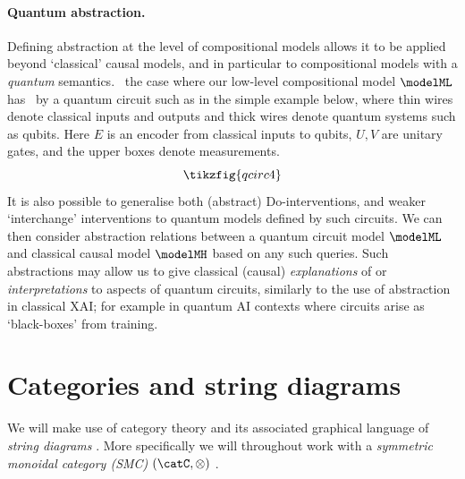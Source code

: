 \documentclass{article}
\begin{document}
\paragraph{Quantum abstraction.}
Defining abstraction at the level of compositional models allows it to be applied beyond `classical' causal models, and in particular to compositional models with a \emph{quantum} semantics. 
\
the case where our low-level compositional model $\modelML$ has \ by a quantum circuit such as in the simple example below, where thin wires denote classical inputs and outputs and thick wires denote quantum systems such as qubits. Here $E$ is an encoder from classical inputs to qubits, $U, V$ are unitary gates, and the upper boxes denote measurements.
\[
\tikzfig{qcirc4}
\]
It is also possible to generalise both (abstract) Do-interventions, and weaker `interchange' interventions to quantum models defined by such circuits. We can then consider abstraction relations between a quantum circuit model $\modelML$ and classical causal model $\modelMH$ based on any such queries. Such abstractions may allow us to give classical (causal) \emph{explanations} of or \emph{interpretations} to aspects of quantum circuits, similarly to the use of abstraction in classical XAI; for example in quantum AI contexts where circuits arise as `black-boxes' from training. 




\section{Categories and string diagrams} \label{sec:setup}

We will make use of category theory and its associated graphical language of \emph{string diagrams} \cite{coecke2006introducing,piedeleu2023introduction,selinger2011survey}. More specifically we will throughout work with a \emph{symmetric monoidal category (SMC)} $(\catC, \otimes)$ . 
\end{document}
